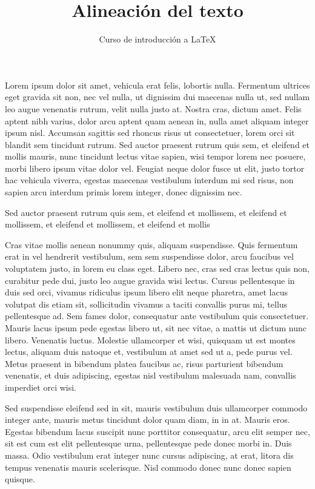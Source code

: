\documentclass[10pt,letterpaper]{article}
\title{Alineación del texto}
\author{Curso de introducción a LaTeX}
\begin{document}
\maketitle
 
Lorem ipsum dolor sit amet, vehicula erat felis, lobortis nulla. Fermentum ultrices eget gravida sit non, nec vel nulla, ut dignissim dui maecenas nulla ut, sed nullam leo augue venenatis rutrum, velit nulla justo at. Nostra cras, dictum amet. Felis aptent nibh varius, dolor arcu aptent quam aenean in, nulla amet aliquam integer ipsum nisl. Accumsan sagittis sed rhoncus risus ut consectetuer, lorem orci sit blandit sem tincidunt rutrum. Sed auctor praesent rutrum quis sem, et eleifend et mollis mauris, nunc tincidunt lectus vitae sapien, wisi tempor lorem nec posuere, morbi libero ipsum vitae dolor vel. Feugiat neque dolor fusce ut elit, justo tortor hac vehicula viverra, egestas maecenas vestibulum interdum mi sed risus, non sapien arcu interdum primis lorem integer, donec dignissim nec.

Sed auctor praesent rutrum quis sem, et eleifend et mollissem, et eleifend et mollissem, et eleifend et mollissem, et eleifend et mollis

\begin{center}
Cras vitae mollis aenean nonummy quis, aliquam suspendisse. Quis fermentum erat in vel hendrerit vestibulum, sem sem suspendisse dolor, arcu faucibus vel voluptatem justo, in lorem eu class eget. Libero nec, cras sed cras lectus quis non, curabitur pede dui, justo leo augue gravida wisi lectus. Cursus pellentesque in duis sed orci, vivamus ridiculus ipsum libero elit neque pharetra, amet lacus volutpat dis etiam sit, sollicitudin vivamus a taciti convallis purus mi, tellus pellentesque ad. Sem fames dolor, consequatur ante vestibulum quis consectetuer. Mauris lacus ipsum pede egestas libero ut, sit nec vitae, a mattis ut dictum nunc libero. Venenatis luctus. Molestie ullamcorper et wisi, quisquam ut est montes lectus, aliquam duis natoque et, vestibulum at amet sed ut a, pede purus vel. Metus praesent in bibendum platea faucibus ac, risus parturient bibendum venenatis, et duis adipiscing, egestas nisl vestibulum malesuada nam, convallis imperdiet orci wisi.
\end{center}

\begin{flushleft}
Sed suspendisse eleifend sed in sit, mauris vestibulum duis ullamcorper commodo integer ante, mauris metus tincidunt dolor quam diam, in in at. Mauris eros. Egestas bibendum lacus suscipit nunc porttitor consequatur, arcu elit semper nec, sit est cum est elit pellentesque urna, pellentesque pede donec morbi in. Duis massa. Odio vestibulum erat integer nunc cursus adipiscing, at erat, litora dis tempus venenatis mauris scelerisque. Nisl commodo donec nunc donec sapien quisque.
\end{flushleft}
\end{document}
